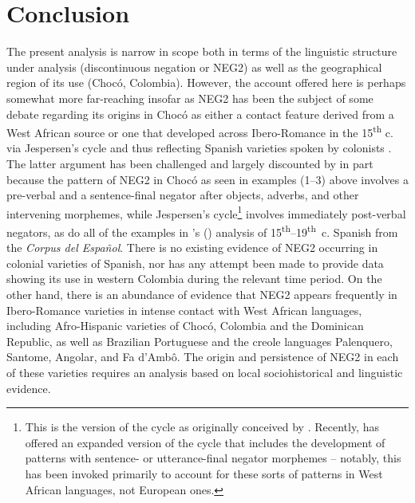 \documentclass[output=paper,colorlinks,citecolor=brown]{langscibook}
\begin{document}
\section{Conclusion}

The present analysis is narrow in scope both in terms of the linguistic structure under analysis (discontinuous negation or NEG2) as well as the geographical region of its use (Chocó, Colombia). However, the account offered here is perhaps somewhat more far-reaching insofar as NEG2 has been the subject of some debate regarding its origins in Chocó as either a contact feature derived from a West African source \parencites[514]{Granda_1978}{Granda_1988}{RuizGarcia_2001}{Schwegler_1991a} or one that developed across Ibero-Romance in the 15\textsuperscript{th} c. via Jespersen’s cycle and thus reflecting Spanish varieties spoken by colonists \citep{Sessarego2017}. The latter argument has been challenged and largely discounted by \citet{Schwegler_2018} in part because the pattern of NEG2 in Chocó as seen in examples (1–3) above involves a pre-verbal and a sentence-final negator after objects, adverbs, and other intervening morphemes, while Jespersen’s cycle\footnote{This is the version of the cycle as originally conceived by \citet{Jespersen_1917}. Recently, \citet{vanderAuwera_2009} has offered an expanded version of the cycle that includes the development of patterns with sentence- or utterance-final negator morphemes – notably, this has been invoked primarily to account for these sorts of patterns in West African languages, not European ones.} involves immediately post-verbal negators, as do all of the examples in \citeauthor{Sessarego2017}’s (\citeyear{Sessarego2017}) analysis of 15\textsuperscript{th}--19\textsuperscript{th}~c. Spanish from the \citet{Davies_2002} \emph{Corpus del Español}. There is no existing evidence of NEG2 occurring in colonial varieties of Spanish, nor has any attempt been made to provide data showing its use in western Colombia during the relevant time period. On the other hand, there is an abundance of evidence that NEG2 appears frequently in Ibero-Romance varieties in intense contact with West African languages, including Afro-Hispanic varieties of Chocó, Colombia and the Dominican Republic, as well as Brazilian Portuguese and the creole languages Palenquero, Santome, Angolar, and Fa d’Ambô. The origin and persistence of NEG2 in each of these varieties requires an analysis based on local sociohistorical and linguistic evidence.
\end{document}
